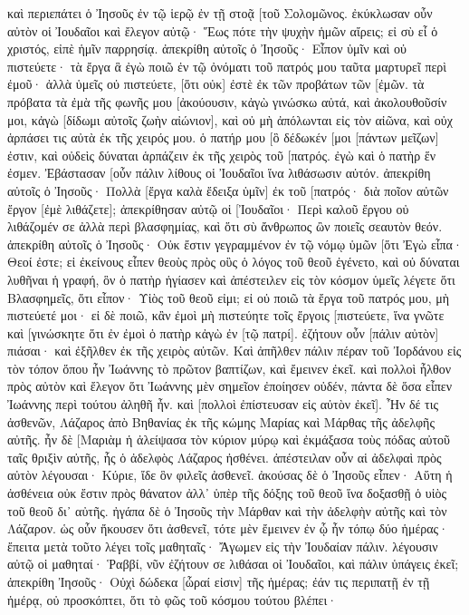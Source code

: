 καὶ περιεπάτει ὁ Ἰησοῦς ἐν τῷ ἱερῷ ἐν τῇ στοᾷ [τοῦ Σολομῶνος. 
ἐκύκλωσαν οὖν αὐτὸν οἱ Ἰουδαῖοι καὶ ἔλεγον αὐτῷ· Ἕως πότε τὴν ψυχὴν ἡμῶν αἴρεις; εἰ σὺ εἶ ὁ χριστός, εἰπὲ ἡμῖν παρρησίᾳ. 
ἀπεκρίθη αὐτοῖς ὁ Ἰησοῦς· Εἶπον ὑμῖν καὶ οὐ πιστεύετε· τὰ ἔργα ἃ ἐγὼ ποιῶ ἐν τῷ ὀνόματι τοῦ πατρός μου ταῦτα μαρτυρεῖ περὶ ἐμοῦ· 
ἀλλὰ ὑμεῖς οὐ πιστεύετε, [ὅτι οὐκ] ἐστὲ ἐκ τῶν προβάτων τῶν [ἐμῶν. 
τὰ πρόβατα τὰ ἐμὰ τῆς φωνῆς μου [ἀκούουσιν, κἀγὼ γινώσκω αὐτά, καὶ ἀκολουθοῦσίν μοι, 
κἀγὼ [δίδωμι αὐτοῖς ζωὴν αἰώνιον], καὶ οὐ μὴ ἀπόλωνται εἰς τὸν αἰῶνα, καὶ οὐχ ἁρπάσει τις αὐτὰ ἐκ τῆς χειρός μου. 
ὁ πατήρ μου [ὃ δέδωκέν [μοι [πάντων μεῖζων] ἐστιν, καὶ οὐδεὶς δύναται ἁρπάζειν ἐκ τῆς χειρὸς τοῦ [πατρός. 
ἐγὼ καὶ ὁ πατὴρ ἕν ἐσμεν. 
Ἐβάστασαν [οὖν πάλιν λίθους οἱ Ἰουδαῖοι ἵνα λιθάσωσιν αὐτόν. 
ἀπεκρίθη αὐτοῖς ὁ Ἰησοῦς· Πολλὰ [ἔργα καλὰ ἔδειξα ὑμῖν] ἐκ τοῦ [πατρός· διὰ ποῖον αὐτῶν ἔργον [ἐμὲ λιθάζετε]; 
ἀπεκρίθησαν αὐτῷ οἱ [Ἰουδαῖοι· Περὶ καλοῦ ἔργου οὐ λιθάζομέν σε ἀλλὰ περὶ βλασφημίας, καὶ ὅτι σὺ ἄνθρωπος ὢν ποιεῖς σεαυτὸν θεόν. 
ἀπεκρίθη αὐτοῖς ὁ Ἰησοῦς· Οὐκ ἔστιν γεγραμμένον ἐν τῷ νόμῳ ὑμῶν [ὅτι Ἐγὼ εἶπα· Θεοί ἐστε; 
εἰ ἐκείνους εἶπεν θεοὺς πρὸς οὓς ὁ λόγος τοῦ θεοῦ ἐγένετο, καὶ οὐ δύναται λυθῆναι ἡ γραφή, 
ὃν ὁ πατὴρ ἡγίασεν καὶ ἀπέστειλεν εἰς τὸν κόσμον ὑμεῖς λέγετε ὅτι Βλασφημεῖς, ὅτι εἶπον· Υἱὸς τοῦ θεοῦ εἰμι; 
εἰ οὐ ποιῶ τὰ ἔργα τοῦ πατρός μου, μὴ πιστεύετέ μοι· 
εἰ δὲ ποιῶ, κἂν ἐμοὶ μὴ πιστεύητε τοῖς ἔργοις [πιστεύετε, ἵνα γνῶτε καὶ [γινώσκητε ὅτι ἐν ἐμοὶ ὁ πατὴρ κἀγὼ ἐν [τῷ πατρί]. 
ἐζήτουν οὖν [πάλιν αὐτὸν] πιάσαι· καὶ ἐξῆλθεν ἐκ τῆς χειρὸς αὐτῶν. 
Καὶ ἀπῆλθεν πάλιν πέραν τοῦ Ἰορδάνου εἰς τὸν τόπον ὅπου ἦν Ἰωάννης τὸ πρῶτον βαπτίζων, καὶ ἔμεινεν ἐκεῖ. 
καὶ πολλοὶ ἦλθον πρὸς αὐτὸν καὶ ἔλεγον ὅτι Ἰωάννης μὲν σημεῖον ἐποίησεν οὐδέν, πάντα δὲ ὅσα εἶπεν Ἰωάννης περὶ τούτου ἀληθῆ ἦν. 
καὶ [πολλοὶ ἐπίστευσαν εἰς αὐτὸν ἐκεῖ]. 
Ἦν δέ τις ἀσθενῶν, Λάζαρος ἀπὸ Βηθανίας ἐκ τῆς κώμης Μαρίας καὶ Μάρθας τῆς ἀδελφῆς αὐτῆς. 
ἦν δὲ [Μαριὰμ ἡ ἀλείψασα τὸν κύριον μύρῳ καὶ ἐκμάξασα τοὺς πόδας αὐτοῦ ταῖς θριξὶν αὐτῆς, ἧς ὁ ἀδελφὸς Λάζαρος ἠσθένει. 
ἀπέστειλαν οὖν αἱ ἀδελφαὶ πρὸς αὐτὸν λέγουσαι· Κύριε, ἴδε ὃν φιλεῖς ἀσθενεῖ. 
ἀκούσας δὲ ὁ Ἰησοῦς εἶπεν· Αὕτη ἡ ἀσθένεια οὐκ ἔστιν πρὸς θάνατον ἀλλ᾽ ὑπὲρ τῆς δόξης τοῦ θεοῦ ἵνα δοξασθῇ ὁ υἱὸς τοῦ θεοῦ δι᾽ αὐτῆς. 
ἠγάπα δὲ ὁ Ἰησοῦς τὴν Μάρθαν καὶ τὴν ἀδελφὴν αὐτῆς καὶ τὸν Λάζαρον. 
ὡς οὖν ἤκουσεν ὅτι ἀσθενεῖ, τότε μὲν ἔμεινεν ἐν ᾧ ἦν τόπῳ δύο ἡμέρας· 
ἔπειτα μετὰ τοῦτο λέγει τοῖς μαθηταῖς· Ἄγωμεν εἰς τὴν Ἰουδαίαν πάλιν. 
λέγουσιν αὐτῷ οἱ μαθηταί· Ῥαββί, νῦν ἐζήτουν σε λιθάσαι οἱ Ἰουδαῖοι, καὶ πάλιν ὑπάγεις ἐκεῖ; 
ἀπεκρίθη Ἰησοῦς· Οὐχὶ δώδεκα [ὧραί εἰσιν] τῆς ἡμέρας; ἐάν τις περιπατῇ ἐν τῇ ἡμέρᾳ, οὐ προσκόπτει, ὅτι τὸ φῶς τοῦ κόσμου τούτου βλέπει· 

